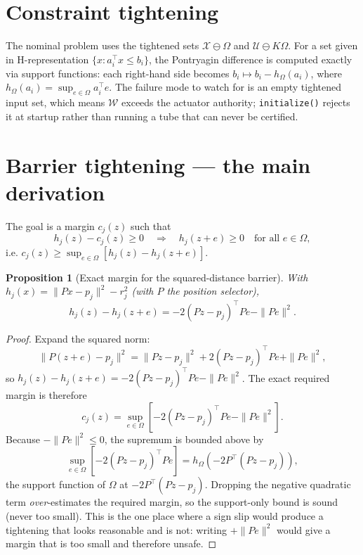 \documentclass[11pt]{article}
\newtheorem{proposition}{Proposition}
\newcommand{\Pdiff}{\ominus}
\begin{document}
\section{Constraint tightening}
The nominal problem uses the tightened sets $\mathcal{X} \Pdiff \Omega$ and $\mathcal{U} \Pdiff
K\Omega$. For a set given in H-representation $\{x : a_i^\top x \le b_i\}$, the Pontryagin
difference is computed exactly via support functions: each right-hand side becomes
$b_i \mapsto b_i - h_{\Omega}(a_i)$, where $h_{\Omega}(a_i) = \sup_{e \in \Omega} a_i^\top e$.
The failure mode to watch for is an empty tightened input set, which means $\mathcal{W}$ exceeds
the actuator authority; \texttt{initialize()} rejects it at startup rather than running a tube that
can never be certified.

\section{Barrier tightening --- the main derivation}
The goal is a margin $c_j(z)$ such that
\[
h_j(z) - c_j(z) \ge 0 \quad\Longrightarrow\quad h_j(z + e) \ge 0 \quad \text{for all } e \in \Omega,
\]
i.e. $c_j(z) \ge \sup_{e \in \Omega} [h_j(z) - h_j(z+e)]$.

\begin{proposition}[Exact margin for the squared-distance barrier]\label{prop:support}
With $h_j(x) = \|Px - p_j\|^2 - r_j^2$ (with $P$ the position selector),
\[
h_j(z) - h_j(z+e) = -2 (Pz - p_j)^\top P e - \|P e\|^2 .
\]
\end{proposition}
\begin{proof}
Expand the squared norm:
\[
\|P(z+e) - p_j\|^2 = \|Pz - p_j\|^2 + 2(Pz-p_j)^\top P e + \|Pe\|^2,
\]
so $h_j(z) - h_j(z+e) = -2(Pz-p_j)^\top P e - \|Pe\|^2$. The exact required margin is therefore
\[
c_j(z) = \sup_{e \in \Omega} \left[ -2 (Pz - p_j)^\top P e - \|Pe\|^2 \right].
\]
Because $-\|Pe\|^2 \le 0$, the supremum is bounded above by
\[
\sup_{e \in \Omega} \left[ -2 (Pz - p_j)^\top P e \right]
= h_\Omega\!\left(-2 P^\top (Pz - p_j)\right),
\]
the support function of $\Omega$ at $-2P^\top(Pz-p_j)$. Dropping the negative quadratic term
\emph{over}-estimates the required margin, so the support-only bound is sound (never too small).
This is the one place where a sign slip would produce a tightening that looks reasonable and is
not: writing $+\|Pe\|^2$ would give a margin that is too small and therefore unsafe.
\end{proof}
\end{document}
